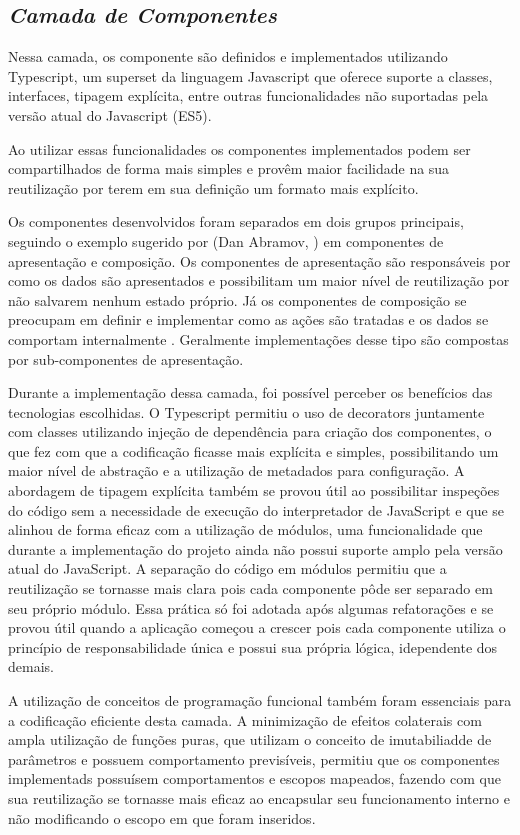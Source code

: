 \subsection{{\it Camada de Componentes}}

Nessa camada, os componente são definidos e implementados utilizando Typescript, um superset da linguagem Javascript que oferece suporte a classes, interfaces, tipagem explícita, entre outras funcionalidades não suportadas pela versão atual do Javascript (ES5).

Ao utilizar essas funcionalidades os componentes implementados podem ser compartilhados de forma mais simples e provêm maior facilidade na sua reutilização por terem em sua definição um formato mais explícito.

Os componentes desenvolvidos foram separados em dois grupos principais, seguindo o exemplo sugerido por (Dan Abramov, ) em componentes de apresentação e composição. Os componentes de apresentação são responsáveis por como os dados são apresentados e possibilitam um maior nível de reutilização por não salvarem nenhum estado próprio. Já os componentes de composição se preocupam em definir e implementar como as ações são tratadas e os dados se comportam internalmente . Geralmente implementações desse tipo são compostas por sub-componentes de apresentação. 

Durante a implementação dessa camada, foi possível perceber os benefícios das tecnologias escolhidas. O Typescript permitiu o uso de decorators juntamente com classes utilizando injeção de dependência para criação dos componentes, o que fez com que a codificação ficasse mais explícita e simples, possibilitando um maior nível de abstração e a utilização de metadados para configuração. A abordagem de tipagem explícita também se provou útil ao possibilitar inspeções do código sem a necessidade de execução do interpretador de JavaScript e que se alinhou de forma eficaz com a utilização de módulos, uma funcionalidade que durante a implementação do projeto ainda não possui suporte amplo pela versão atual do JavaScript. A separação do código em módulos permitiu que a reutilização se tornasse mais clara pois cada componente pôde ser separado em seu próprio módulo. Essa prática só foi adotada após algumas refatorações e se provou útil quando a aplicação começou a crescer pois cada componente utiliza o princípio de responsabilidade única e possui sua própria lógica, idependente dos demais.

A utilização de conceitos de programação funcional também foram essenciais para a codificação eficiente desta camada. A minimização de efeitos colaterais com ampla utilização de funções puras, que utilizam o conceito de imutabiliadde de parâmetros e possuem comportamento previsíveis, permitiu que os componentes implementads possuísem comportamentos e escopos mapeados, fazendo com que sua reutilização se tornasse mais eficaz ao encapsular seu funcionamento interno e não modificando o escopo em que foram inseridos.

